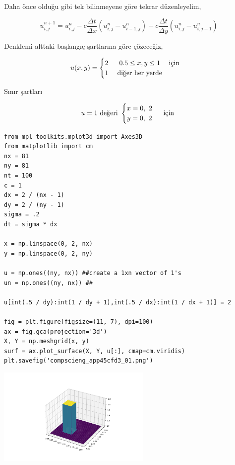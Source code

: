 \documentclass[12pt,fleqn]{article}\usepackage{../../common}
\begin{document}
Daha önce olduğu gibi tek bilinmeyene göre tekrar düzenleyelim,

$$
u_{i,j}^{n+1} =
u_{i,j}^n-c \frac{\Delta t}{\Delta x}(u_{i,j}^n-u_{i-1,j}^n) -
c \frac{\Delta t}{\Delta y}(u_{i,j}^n-u_{i,j-1}^n)
$$

Denklemi alttaki başlangıç şartlarına göre çözeceğiz,

$$
u(x,y) = \begin{cases}
\begin{matrix}
2\ & 0.5 \leq x, y \leq 1   & \text{için}  \cr
1\ & \text{diğer her yerde}
\end{matrix}\end{cases}
$$

Sınır şartları

$$
u = 1\ \text{değeri } \begin{cases}
\begin{matrix}
x =  0,\ 2 \cr
y =  0,\ 2 \end{matrix}\end{cases}
\text{ için }
$$

\begin{verbatim}
from mpl_toolkits.mplot3d import Axes3D    
from matplotlib import cm
nx = 81
ny = 81
nt = 100
c = 1
dx = 2 / (nx - 1)
dy = 2 / (ny - 1)
sigma = .2
dt = sigma * dx

x = np.linspace(0, 2, nx)
y = np.linspace(0, 2, ny)

u = np.ones((ny, nx)) ##create a 1xn vector of 1's
un = np.ones((ny, nx)) ##

u[int(.5 / dy):int(1 / dy + 1),int(.5 / dx):int(1 / dx + 1)] = 2 

fig = plt.figure(figsize=(11, 7), dpi=100)
ax = fig.gca(projection='3d')                      
X, Y = np.meshgrid(x, y)                            
surf = ax.plot_surface(X, Y, u[:], cmap=cm.viridis)
plt.savefig('compscieng_app45cfd3_01.png')
\end{verbatim}

\includegraphics[width=20em]{compscieng_app45cfd3_01.png}
\end{document}
